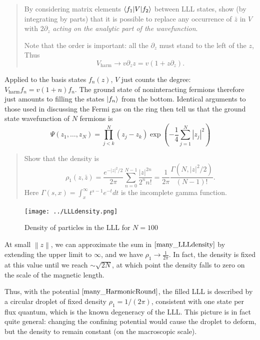 \documentclass[
  letterpaper,
  DIV=11,
  numbers=noendperiod]{scrreprt}
\begin{document}
\begin{quote}
By considering matrix elements \(\langle{f_1}\rvert V\lvert{f_2}\rangle\) between LLL
states, show (by integrating by parts) that it is possible to replace
any occurrence of \(\bar z\) in \(V\) with \(2\partial_z\) \emph{acting
on the analytic part of the wavefunction}.

Note that the order is important: all the \(\partial_z\) must stand to
the left of the \(z\), Thus \[
V_\text{harm}\longrightarrow v\partial_z z =  v\left(1+z \partial_z\right).
\label{many_HarmonicProject}
\]
\end{quote}

Applied to the basis states \(f_n(z)\), \(V\) just counts the degree:
\(V_\text{harm} f_n = v(1+n)f_n\). The ground state of noninteracting
fermions therefore just amounts to filling the states \(\lvert{f_n}\rangle\) from
the bottom. Identical arguments to those used in discussing the Fermi
gas on the ring then tell us that the ground state wavefunction of \(N\)
fermions is \[
\Psi(z_1,\ldots, z_N) = \prod_{j<k}^N (z_j-z_k) \exp\left(-\frac{1}{4}\sum_{j=1}^N\left|z_j\right|^2\right)
\label{many_nu1}
\]

\begin{quote}
Show that the density is \[
\rho_1(z,\bar z) = \frac{e^{-|z|^2/2}}{2\pi}\sum_{n=0}^{N-1} \frac{\left|z\right|^{2n}}{2^n n!} = \frac{1}{2\pi} \frac{\Gamma(N,|z|^2/2)}{(N-1)!}.
\label{many_LLLdensity}
\] Here \(\Gamma(s,x) = \int^\infty_x t^{s-1}e^{-t}dt\) is the
incomplete gamma function.
\end{quote}

\begin{figure}[H]

{\centering \texttt{[image: ../LLLdensity.png]}

}

\caption{Density of particles in the LLL for \(N=100\)}

\end{figure}%

At small \(\left\|z\right\|\), we can approximate the sum in
\(\eqref{many_LLLdensity}\) by extending the upper limit to \(\infty\),
and we have \(\rho_1\to \frac{1}{2\pi}\). In fact, the density is fixed
at this value until we reach \(\sim\sqrt{2N}\), at which point the
density falls to zero on the scale of the magnetic length.

Thus, with the potential \(\eqref{many_HarmonicRound}\), the filled LLL
is described by a circular droplet of fixed density
\(\rho_1 = 1/(2\pi)\), consistent with one state per flux quantum, which
is the known degeneracy of the LLL. This picture is in fact quite
general: changing the confining potential would cause the droplet to
deform, but the density to remain constant (on the macroscopic scale).
\end{document}
